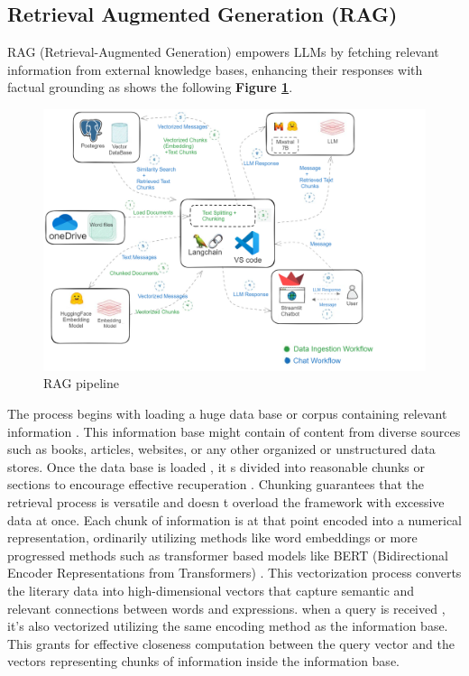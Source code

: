 \subsection{Retrieval Augmented Generation (RAG)}
RAG (Retrieval-Augmented Generation) empowers LLMs by fetching relevant information from external knowledge bases, enhancing their responses with factual grounding as shows the following \textbf{Figure \ref{fig:RAG}}\cite{w13}.
\begin{figure}[H]
    \label{fig:RAG}
    \centering
        \includegraphics[width=1 \linewidth]{assets/pipeline_rag.png}
    \caption{RAG pipeline}
\end{figure}
The process begins with loading a huge data base or corpus containing relevant information . This information base might contain of content from diverse sources such as books, articles, websites, or any other organized or unstructured data stores.
\vskip 0.5cm
Once the data base is loaded , it s divided into reasonable chunks or sections to encourage effective recuperation . Chunking guarantees that the retrieval process is versatile and doesn t overload the framework with excessive data at once.
\vskip 0.5cm
Each chunk of information is at that point encoded into a numerical representation, ordinarily utilizing methods like word embeddings or more progressed methods such as transformer based models like BERT (Bidirectional Encoder Representations from Transformers) . This vectorization process converts the literary data into high-dimensional vectors that capture semantic and relevant connections between words and expressions.
\vskip 0.5cm
when a query is received , it's also vectorized utilizing the same encoding method as the information base. This grants for effective closeness computation between the query vector and the vectors representing chunks of information inside the information base.
